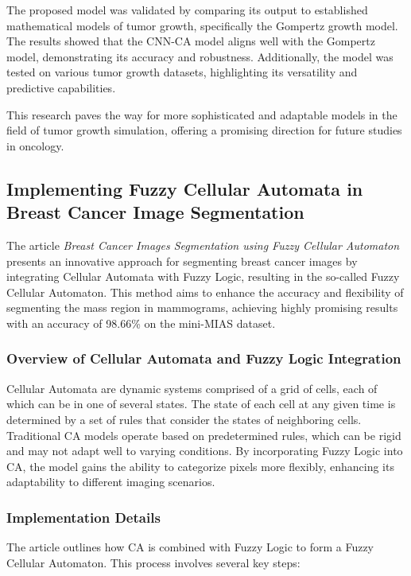 \documentclass[9pt,a4paper,twoside]{tau-class/tau}
\begin{document}
The proposed model was validated by comparing its output to established mathematical models of tumor growth, specifically the Gompertz growth model. The results showed that the CNN-CA model aligns well with the Gompertz model, demonstrating its accuracy and robustness. Additionally, the model was tested on various tumor growth datasets, highlighting its versatility and predictive capabilities.

This research paves the way for more sophisticated and adaptable models in the field of tumor growth simulation, offering a promising direction for future studies in oncology.

\subsection{Implementing Fuzzy Cellular Automata in Breast Cancer Image Segmentation}

The article \textit{Breast Cancer Images Segmentation using Fuzzy Cellular Automaton} presents an innovative approach for segmenting breast cancer images by integrating Cellular Automata  with Fuzzy Logic, resulting in the so-called Fuzzy Cellular Automaton. This method aims to enhance the accuracy and flexibility of segmenting the mass region in mammograms, achieving highly promising results with an accuracy of 98.66\% on the mini-MIAS dataset.\cite{ION2023999}

\subsubsection{Overview of Cellular Automata and Fuzzy Logic Integration}

Cellular Automata are dynamic systems comprised of a grid of cells, each of which can be in one of several states. The state of each cell at any given time is determined by a set of rules that consider the states of neighboring cells. Traditional CA models operate based on predetermined rules, which can be rigid and may not adapt well to varying conditions. By incorporating Fuzzy Logic into CA, the model gains the ability to categorize pixels more flexibly, enhancing its adaptability to different imaging scenarios.

\subsubsection{Implementation Details}

The article outlines how CA is combined with Fuzzy Logic to form a Fuzzy Cellular Automaton. This process involves several key steps:
\end{document}
